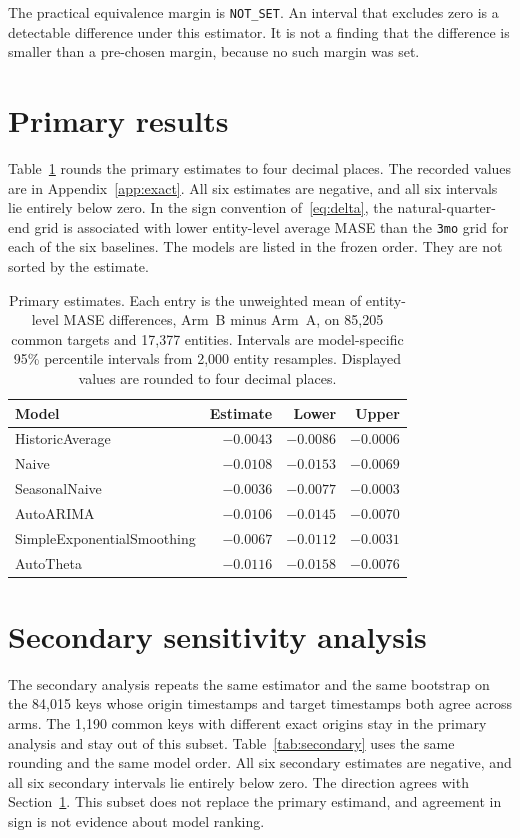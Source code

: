 \documentclass[11pt]{article}
\newcommand{\armA}{Arm~A}
\newcommand{\armB}{Arm~B}
\begin{document}
The practical equivalence margin is \texttt{NOT\_SET}. An interval that excludes zero is a detectable difference under this estimator. It is not a finding that the difference is smaller than a pre-chosen margin, because no such margin was set.

\section{Primary results}
\label{sec:results}

Table~\ref{tab:primary} rounds the primary estimates to four decimal places. The recorded values are in Appendix~\ref{app:exact}. All six estimates are negative, and all six intervals lie entirely below zero. In the sign convention of~\eqref{eq:delta}, the natural-quarter-end grid is associated with lower entity-level average MASE than the \texttt{3mo} grid for each of the six baselines. The models are listed in the frozen order. They are not sorted by the estimate.

\begin{table}[ht]
\centering
\caption{Primary estimates. Each entry is the unweighted mean of entity-level MASE differences, \armB{} minus \armA{}, on 85{,}205 common targets and 17{,}377 entities. Intervals are model-specific 95\% percentile intervals from 2{,}000 entity resamples. Displayed values are rounded to four decimal places.}
\label{tab:primary}
\begin{tabular}{lrrr}
\toprule
Model & Estimate & Lower & Upper \\
\midrule
HistoricAverage & $-0.0043$ & $-0.0086$ & $-0.0006$ \\
Naive & $-0.0108$ & $-0.0153$ & $-0.0069$ \\
SeasonalNaive & $-0.0036$ & $-0.0077$ & $-0.0003$ \\
AutoARIMA & $-0.0106$ & $-0.0145$ & $-0.0070$ \\
SimpleExponentialSmoothing & $-0.0067$ & $-0.0112$ & $-0.0031$ \\
AutoTheta & $-0.0116$ & $-0.0158$ & $-0.0076$ \\
\bottomrule
\end{tabular}
\end{table}

\section{Secondary sensitivity analysis}
\label{sec:secondary}

The secondary analysis repeats the same estimator and the same bootstrap on the 84{,}015 keys whose origin timestamps and target timestamps both agree across arms. The 1{,}190 common keys with different exact origins stay in the primary analysis and stay out of this subset. Table~\ref{tab:secondary} uses the same rounding and the same model order. All six secondary estimates are negative, and all six secondary intervals lie entirely below zero. The direction agrees with Section~\ref{sec:results}. This subset does not replace the primary estimand, and agreement in sign is not evidence about model ranking.
\end{document}
